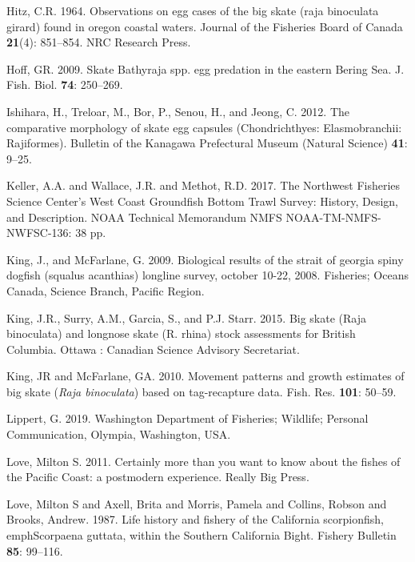 \documentclass[12pt,]{article}
\begin{document}
\leavevmode\hypertarget{ref-Hitz1964}{}%
Hitz, C.R. 1964. Observations on egg cases of the big skate (raja
binoculata girard) found in oregon coastal waters. Journal of the
Fisheries Board of Canada \textbf{21}(4): 851--854. NRC Research Press.

\leavevmode\hypertarget{ref-Hoff2009}{}%
Hoff, GR. 2009. Skate Bathyraja spp. egg predation in the eastern Bering
Sea. J. Fish. Biol. \textbf{74}: 250--269.

\leavevmode\hypertarget{ref-Ishihara2012}{}%
Ishihara, H., Treloar, M., Bor, P., Senou, H., and Jeong, C. 2012. The
comparative morphology of skate egg capsules (Chondrichthyes:
Elasmobranchii: Rajiformes). Bulletin of the Kanagawa Prefectural Museum
(Natural Science) \textbf{41}: 9--25.

\leavevmode\hypertarget{ref-Keller2017}{}%
Keller, A.A. and Wallace, J.R. and Methot, R.D. 2017. The Northwest
Fisheries Science Center's West Coast Groundfish Bottom Trawl Survey:
History, Design, and Description. NOAA Technical Memorandum NMFS
NOAA-TM-NMFS-NWFSC-136: 38 pp.

\leavevmode\hypertarget{ref-KingandMcF2009}{}%
King, J., and McFarlane, G. 2009. Biological results of the strait of
georgia spiny dogfish (squalus acanthias) longline survey, october
10-22, 2008. Fisheries; Oceans Canada, Science Branch, Pacific Region.

\leavevmode\hypertarget{ref-King2015}{}%
King, J.R., Surry, A.M., Garcia, S., and P.J. Starr. 2015. Big skate
(Raja binoculata) and longnose skate (R. rhina) stock assessments for
British Columbia. Ottawa : Canadian Science Advisory Secretariat.

\leavevmode\hypertarget{ref-KingandMcF2010}{}%
King, JR and McFarlane, GA. 2010. Movement patterns and growth estimates
of big skate (\emph{Raja binoculata}) based on tag-recapture data. Fish.
Res. \textbf{101}: 50--59.

\leavevmode\hypertarget{ref-GregLippert}{}%
Lippert, G. 2019. Washington Department of Fisheries; Wildlife; Personal
Communication, Olympia, Washington, USA.

\leavevmode\hypertarget{ref-Love2011}{}%
Love, Milton S. 2011. Certainly more than you want to know about the
fishes of the Pacific Coast: a postmodern experience. Really Big Press.

\leavevmode\hypertarget{ref-Love1987}{}%
Love, Milton S and Axell, Brita and Morris, Pamela and Collins, Robson
and Brooks, Andrew. 1987. Life history and fishery of the California
scorpionfish,\\
emphScorpaena guttata, within the Southern California Bight. Fishery
Bulletin \textbf{85}: 99--116.
\end{document}
